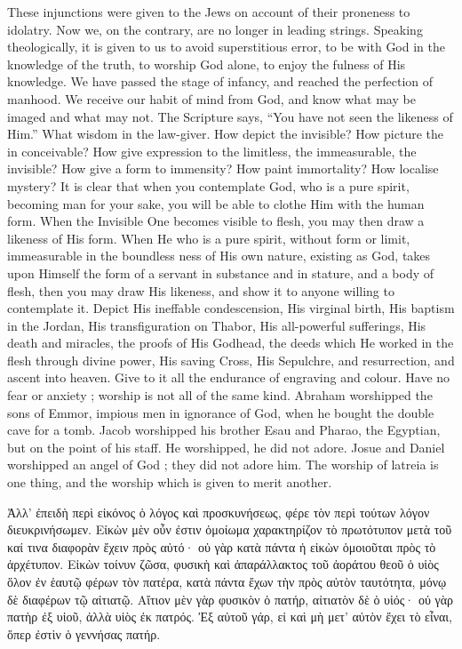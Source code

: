 \documentclass[10pt]{book}
\newcommand{\switchgreek}[1][]{\selectlanguage{polutonikogreek} \switchcolumn*[#1]}
\begin{document}
\begin{paracol}{2}
These injunctions were given to the Jews on 
account of their proneness to idolatry. Now 
we, on the contrary, are no longer in leading 
strings. Speaking theologically, it is given to 
us to avoid superstitious error, to be with God 
in the knowledge of the truth, to worship God 
alone, to enjoy the fulness of His knowledge. 
We have passed the stage of infancy, and 
reached the perfection of manhood. We receive 
our habit of mind from God, and know what 
may be imaged and what may not. The 
Scripture says, ``You have not seen the likeness 
of Him.'' What wisdom in the law-giver. How 
depict the invisible? How picture the in 
conceivable? How give expression to the 
limitless, the immeasurable, the invisible? 
How give a form to immensity? How paint 
immortality? How localise mystery? It is 
clear that when you contemplate God, who is 
a pure spirit, becoming man for your sake, 
you will be able to clothe Him with the human 
form. When the Invisible One becomes visible 
to flesh, you may then draw a likeness of His 
form. When He who is a pure spirit, without 
form or limit, immeasurable in the boundless 
ness of His own nature, existing as God, takes 
upon Himself the form of a servant in substance 
and in stature, and a body of flesh, then you 
may draw His likeness, and show it to anyone 
willing to contemplate it. Depict His ineffable 
condescension, His virginal birth, His baptism 
in the Jordan, His transfiguration on Thabor, 
His all-powerful sufferings, His death and 
miracles, the proofs of His Godhead, the deeds 
which He worked in the flesh through divine 
power, His saving Cross, His Sepulchre, and 
resurrection, and ascent into heaven. Give to 
it all the endurance of engraving and colour. 
Have no fear or anxiety ; worship is not all of 
the same kind. Abraham worshipped the sons 
of Emmor, impious men in ignorance of God, 
when he bought the double cave for a tomb. 
Jacob worshipped his brother Esau and Pharao, 
the Egyptian, but on the point of his staff.
He worshipped, he did not adore. Josue and 
Daniel worshipped an angel of God ; they did 
not adore him. The worship of latreia is one 
thing, and the worship which is given to merit 
another.

\switchgreek

Ἀλλ’ ἐπειδὴ περὶ εἰκόνος ὁ λόγος καὶ προσκυνήσεως, φέρε τὸν περὶ τούτων λόγον διευκρινήσωμεν. Εἰκὼν μὲν οὖν ἐστιν ὁμοίωμα χαρακτηρίζον τὸ πρωτότυπον μετὰ τοῦ καί τινα διαφορὰν ἔχειν πρὸς αὐτό· οὐ γὰρ κατὰ πάντα ἡ εἰκὼν ὁμοιοῦται πρὸς τὸ ἀρχέτυπον. Εἰκὼν τοίνυν ζῶσα, φυσικὴ καὶ ἀπαράλλακτος τοῦ ἀοράτου θεοῦ ὁ υἱὸς ὅλον ἐν ἑαυτῷ φέρων τὸν πατέρα, κατὰ πάντα ἔχων τὴν πρὸς αὐτὸν ταυτότητα, μόνῳ δὲ διαφέρων τῷ αἰτιατῷ. Αἴτιον μὲν γὰρ φυσικὸν ὁ πατήρ, αἰτιατὸν δὲ ὁ υἱός· οὐ γὰρ πατὴρ ἐξ υἱοῦ, ἀλλὰ υἱὸς ἐκ πατρός. Ἐξ αὐτοῦ γάρ, εἰ καὶ μὴ μετ’ αὐτὸν ἔχει τὸ εἶναι, ὅπερ ἐστὶν ὁ γεννήσας πατήρ.


\end{paracol}
\end{document}
